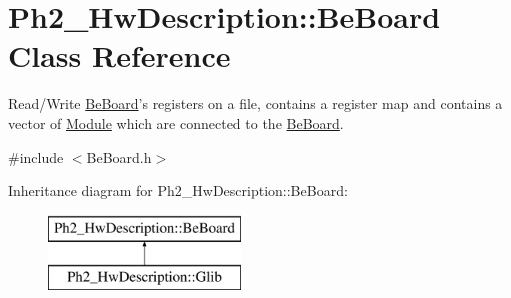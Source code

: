 \hypertarget{class_ph2___hw_description_1_1_be_board}{\section{Ph2\-\_\-\-Hw\-Description\-:\-:Be\-Board Class Reference}
\label{class_ph2___hw_description_1_1_be_board}
}


Read/\-Write \hyperlink{class_ph2___hw_description_1_1_be_board}{Be\-Board}'s registers on a file, contains a register map and contains a vector of \hyperlink{class_ph2___hw_description_1_1_module}{Module} which are connected to the \hyperlink{class_ph2___hw_description_1_1_be_board}{Be\-Board}.  




{\ttfamily \#include $<$Be\-Board.\-h$>$}

Inheritance diagram for Ph2\-\_\-\-Hw\-Description\-:\-:Be\-Board\-:\begin{figure}[H]
\begin{center}
\leavevmode
\includegraphics[height=2.000000cm]{class_ph2___hw_description_1_1_be_board}
\end{center}
\end{figure}

